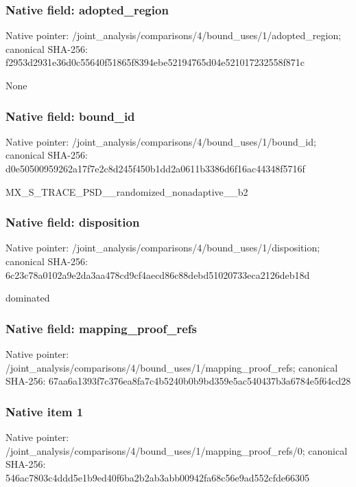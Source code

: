 \documentclass[10pt,a4paper]{article}
\begin{document}
\subsubsection{Native field: adopted\_\allowbreak{}region}
Native pointer: /joint\_\allowbreak{}analysis/comparisons/4/bound\_\allowbreak{}uses/1/adopted\_\allowbreak{}region; canonical SHA-256: f2953d2931e36d0c55640f51865f8394ebe52194765d04e521017232558f871c

\begingroup\raggedright\sloppy None\par\endgroup

\subsubsection{Native field: bound\_\allowbreak{}id}
Native pointer: /joint\_\allowbreak{}analysis/comparisons/4/bound\_\allowbreak{}uses/1/bound\_\allowbreak{}id; canonical SHA-256: d0e50500959262a17f7e2c8d245f450b1dd2a0611b3386d6f16ac44348f5716f

\begingroup\raggedright\sloppy MX\_\allowbreak{}S\_\allowbreak{}TRACE\_\allowbreak{}PSD\_\allowbreak{}\_\allowbreak{}randomized\_\allowbreak{}nonadaptive\_\allowbreak{}\_\allowbreak{}b2\par\endgroup

\subsubsection{Native field: disposition}
Native pointer: /joint\_\allowbreak{}analysis/comparisons/4/bound\_\allowbreak{}uses/1/disposition; canonical SHA-256: 6c23c78a0102a9e2da3aa478cd9cf4aecd86c88debd51020733eca2126deb18d

\begingroup\raggedright\sloppy dominated\par\endgroup

\subsubsection{Native field: mapping\_\allowbreak{}proof\_\allowbreak{}refs}
Native pointer: /joint\_\allowbreak{}analysis/comparisons/4/bound\_\allowbreak{}uses/1/mapping\_\allowbreak{}proof\_\allowbreak{}refs; canonical SHA-256: 67aa6a1393f7c376ea8fa7c4b5240b0b9bd359e5ac540437b3a6784e5f64cd28

\subsubsection{Native item 1}
Native pointer: /joint\_\allowbreak{}analysis/comparisons/4/bound\_\allowbreak{}uses/1/mapping\_\allowbreak{}proof\_\allowbreak{}refs/0; canonical SHA-256: 546ac7803c4ddd5e1b9ed40f6ba2b2ab3abb00942fa68c56e9ad552cfde66305
\end{document}

